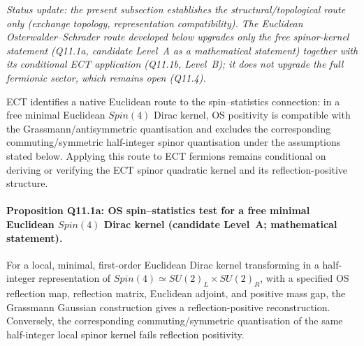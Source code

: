 

\textit{Status update: the present subsection establishes the
structural/topological route only (exchange topology,
representation compatibility).
The Euclidean Osterwalder--Schrader route developed below upgrades
only the \emph{free spinor-kernel} statement (Q11.1a, candidate
Level~A as a mathematical statement) together with its conditional
ECT application (Q11.1b, Level~B); it does not upgrade the full
fermionic sector, which remains open (Q11.4).}

ECT identifies a native Euclidean route to the spin--statistics
connection: in a free minimal Euclidean $Spin(4)$ Dirac kernel, OS
positivity is compatible with the Grassmann/antisymmetric
quantisation and excludes the corresponding commuting/symmetric
half-integer spinor quantisation under the assumptions stated
below.
Applying this route to ECT fermions remains conditional on deriving
or verifying the ECT spinor quadratic kernel and its
reflection-positive structure.


\paragraph{Proposition Q11.1a: OS spin--statistics test for a free
minimal Euclidean $Spin(4)$ Dirac kernel (candidate Level~A;
mathematical statement).}
For a local, minimal, first-order Euclidean Dirac kernel
transforming in a half-integer representation of
$Spin(4)\simeq SU(2)_L\times SU(2)_R$, with a specified OS
reflection map, reflection matrix, Euclidean adjoint, and positive
mass gap, the Grassmann Gaussian construction gives a
reflection-positive reconstruction.
Conversely, the corresponding commuting/symmetric quantisation of
the same half-integer local spinor kernel fails reflection
positivity.

